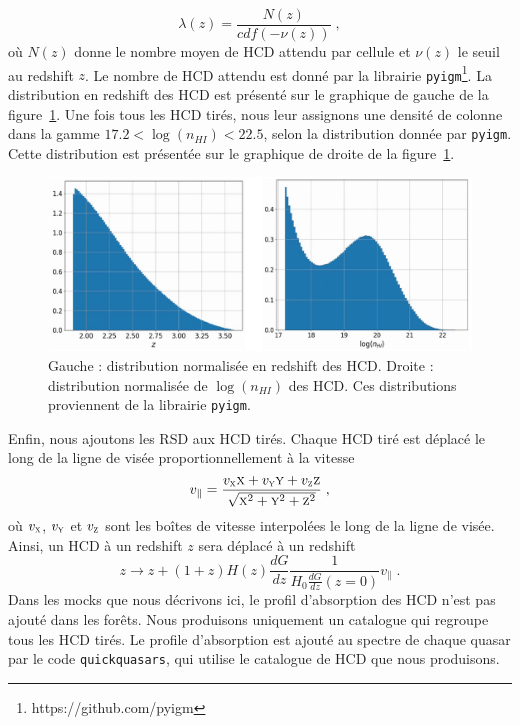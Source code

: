 \documentclass[11pt, twoside, a4paper, openright]{report}
\begin{document}
\begin{equation}
  \lambda(z) = \frac{N(z)}{cdf(-\nu(z))} \; ,
\end{equation}
où $N(z)$ donne le nombre moyen de HCD attendu par cellule et $\nu(z)$ le seuil au redshift $z$. Le nombre de HCD attendu est donné par la librairie \texttt{pyigm}\footnote{https://github.com/pyigm}. La distribution en redshift des HCD est présenté sur le graphique de gauche de la figure~\ref{fig:distrib_dla}. Une fois tous les HCD tirés, nous leur assignons une densité de colonne dans la gamme $\num{17.2} < \log(n_{HI}) < \num{22.5}$, selon la distribution donnée par \texttt{pyigm}. Cette distribution est présentée sur le graphique de droite de la figure~\ref{fig:distrib_dla}.
\begin{figure}
  \centering
  \includegraphics[scale=0.38]{distrib_dla}
  \caption{Gauche : distribution normalisée en redshift des HCD. Droite : distribution normalisée de $\log(n_{HI})$ des HCD. Ces distributions proviennent de la librairie \texttt{pyigm}.}
  \label{fig:distrib_dla}
\end{figure}
Enfin, nous ajoutons les RSD aux HCD tirés. Chaque HCD tiré est déplacé le long de la ligne de visée proportionnellement à la vitesse
\begin{equation}
v_{\parallel} = \frac{v_{\textsc{x}} \textsc{x} + v_{\textsc{y}} \textsc{y} + v_{\textsc{z}} \textsc{z}}{\sqrt{\textsc{x}^2 + \textsc{y}^2 + \textsc{z}^2}} \; ,
\end{equation}
où $v_{\textsc{x}}$, $v_{\textsc{y}}$ et $v_{\textsc{z}}$ sont les boîtes de vitesse interpolées le long de la ligne de visée. Ainsi, un HCD à un redshift $z$ sera déplacé à un redshift
\begin{equation}
   z \rightarrow  z + (1+z) H(z) \frac{dG}{dz} \frac{1}{H_0 \frac{dG}{dz}(z=0)} v_{\parallel} \; .
\end{equation}
Dans les mocks que nous décrivons ici, le profil d'absorption des HCD n'est pas ajouté dans les forêts. Nous produisons uniquement un catalogue qui regroupe tous les HCD tirés. Le profile d'absorption est ajouté au spectre de chaque quasar par le code \texttt{quickquasars}, qui utilise le catalogue de HCD que nous produisons.
\end{document}
